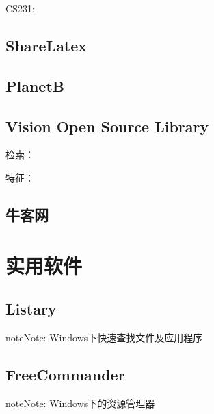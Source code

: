 \documentclass[letterpaper,10pt,english]{sphinxmanual}
\begin{document}
CS231: 


\section{ShareLatex}
\label{\detokenize{link/index:sharelatex}}


\section{PlanetB}
\label{\detokenize{link/index:planetb}}


\section{Vision Open Source Library}
\label{\detokenize{link/index:vision-open-source-library}}
检索： 

特征： 


\section{牛客网}
\label{\detokenize{link/index:id2}}


\chapter{实用软件}
\label{\detokenize{softwares/index::doc}}\label{\detokenize{softwares/index:id1}}

\section{Listary}
\label{\detokenize{softwares/index:listary}}
\begin{sphinxadmonition}{note}{Note:}
Windows下快速查找文件及应用程序

\end{sphinxadmonition}


\section{FreeCommander}
\label{\detokenize{softwares/index:freecommander}}
\begin{sphinxadmonition}{note}{Note:}
Windows下的资源管理器

\end{sphinxadmonition}
\end{document}
